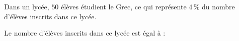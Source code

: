 
Dans un lycée, $50$ élèves étudient le Grec, ce qui représente $4\,\%$ du nombre d'élèves inscrits dans ce lycée.

Le nombre d'élèves inscrits dans ce lycée est égal à :

\smallskip

